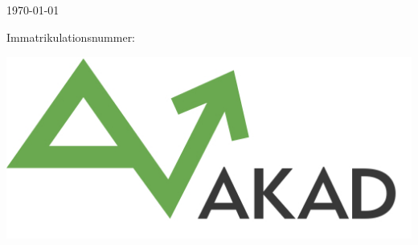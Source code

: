\documentclass[a4paper,12pt]{article}
\newif\iflistoffigures
\newif\iflistoftables
\newif\ifacronym
\begin{document}
\begin{center}
\thispagestyle{empty}
\vspace{9cm}

\Huge{\Titel}
\vspace{1cm}
\onehalfspacing

\Large{\Betreff}

\vspace{1cm}
\Large{\Betreuer \\}
\normalsize
\vspace{2cm}

\Name \\ \Strasse \\ \PlzOrt
\\
\vspace{2cm}

\today

Immatrikulationsnummer: \Immatrikulationsnummer

\href{mailto:\Email}{\Email}
\vspace{3cm}

\includegraphics[scale=0.35]{akad_logo.png}

\end{center}

\clearpage

\normalsize


\begin{spacing}{1.0} %
\newpage

\tableofcontents 
\newpage

\iflistoffigures
\listoffigures 
\newpage
\fi

\iflistoftables
\listoftables 
\newpage
\fi

\ifacronym
\section*{Abkürzungsverzeichnis}
\addcontentsline{toc}{section}{Abkürzungsverzeichnis} 
\begin{acronym}[ABK]
 \acro{Abk}{Abkürzungen}
 \acro{Test}{Wird nicht im Text verwendet und taucht auch nicht im Verzeichnis auf}
\end{acronym}
\fi

\end{spacing} 
\end{document}
